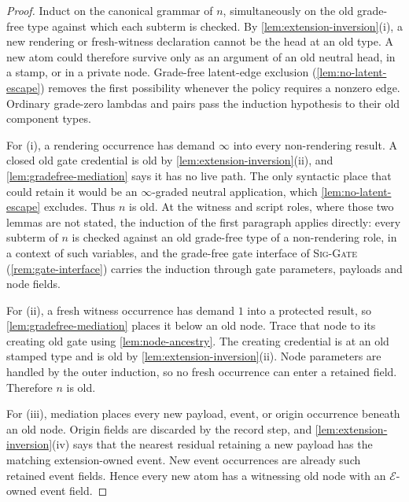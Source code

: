 \documentclass[11pt]{article}
\numberwithin{equation}{section}
\theoremstyle{definition}
\theoremstyle{plain}
\theoremstyle{remark}
\newcommand{\absent}{\boldsymbol\infty}
\begin{document}
\begin{proof}
Induct on the canonical grammar of \(n\), simultaneously on the old
grade-free type against which each subterm is checked.  By
\cref{lem:extension-inversion}(i), a new rendering or fresh-witness
declaration cannot be the head at an old type.  A new atom could therefore
survive only as an argument of an old neutral head, in a stamp, or in a private
node.  Grade-free latent-edge exclusion
(\cref{lem:no-latent-escape}) removes the first possibility whenever the
policy requires a nonzero edge.  Ordinary grade-zero lambdas and pairs pass
the induction hypothesis to their old component types.

For (i), a rendering occurrence has demand \(\absent\) into every
non-rendering result.  A closed old gate credential is old by
\cref{lem:extension-inversion}(ii), and
\cref{lem:gradefree-mediation} says it has no live path.  The only syntactic
place that could retain it would be an \(\absent\)-graded neutral application,
which \cref{lem:no-latent-escape} excludes.  Thus \(n\) is old.  At the
witness and script roles, where those two lemmas are not stated, the
induction of the first paragraph applies directly: every subterm of \(n\) is
checked against an old grade-free type of a non-rendering role, in a context
of such variables, and the grade-free gate interface of \textsc{Sig-Gate}
(\cref{rem:gate-interface}) carries the induction through gate parameters,
payloads and node fields.

For (ii), a fresh witness occurrence has demand \(1\) into a protected
result, so \cref{lem:gradefree-mediation} places it below an old node.  Trace
that node to its creating old gate using \cref{lem:node-ancestry}.  The
creating credential is at an old stamped type and is old by
\cref{lem:extension-inversion}(ii).  Node parameters are handled by the
outer induction, so no fresh occurrence can enter a retained field.  Therefore
\(n\) is old.

For (iii), mediation places every new payload, event, or origin occurrence
beneath an old node.  Origin fields are discarded by the record step, and
\cref{lem:extension-inversion}(iv) says that the nearest residual retaining a
new payload has the matching extension-owned event.  New event occurrences
are already such retained event fields.  Hence every new atom has a witnessing
old node with an \(\mathcal E\)-owned event field.
\end{proof}
\end{document}
